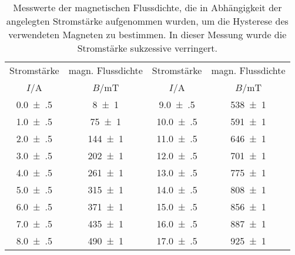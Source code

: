 \begin{table}[!h]
	\centering
	\begin{tabular}{cccc}
		\toprule
		Stromstärke & magn. Flussdichte & Stromstärke & magn. Flussdichte\\
		$I$/\si{\ampere} & $B$/\si{\milli\tesla} & $I$/\si{\ampere} & $B$/\si{\milli\tesla}\\
\midrule
		\num{0.0(5)} & \num{8(1)} & \num{9.0(5)} & \num{538(1)}\\
		\num{1.0(5)} & \num{75(1)} & \num{10.0(5)} & \num{591(1)}\\
		\num{2.0(5)} & \num{144(1)} & \num{11.0(5)} & \num{646(1)}\\
		\num{3.0(5)} & \num{202(1)} & \num{12.0(5)} & \num{701(1)}\\
		\num{4.0(5)} & \num{261(1)} & \num{13.0(5)} & \num{775(1)}\\
		\num{5.0(5)} & \num{315(1)} & \num{14.0(5)} & \num{808(1)}\\
		\num{6.0(5)} & \num{371(1)} & \num{15.0(5)} & \num{856(1)}\\
		\num{7.0(5)} & \num{435(1)} & \num{16.0(5)} & \num{887(1)}\\
		\num{8.0(5)} & \num{490(1)} & \num{17.0(5)} & \num{925(1)}\\
		\bottomrule
	\end{tabular}
	\caption{Messwerte der magnetischen Flussdichte, die in Abhängigkeit der angelegten Stromstärke
                        aufgenommen wurden, um die Hysterese des verwendeten Magneten zu bestimmen. 
                        In dieser Messung wurde die Stromstärke sukzessive verringert. \label{tab:hysterese_zunehmend}}
\end{table}
